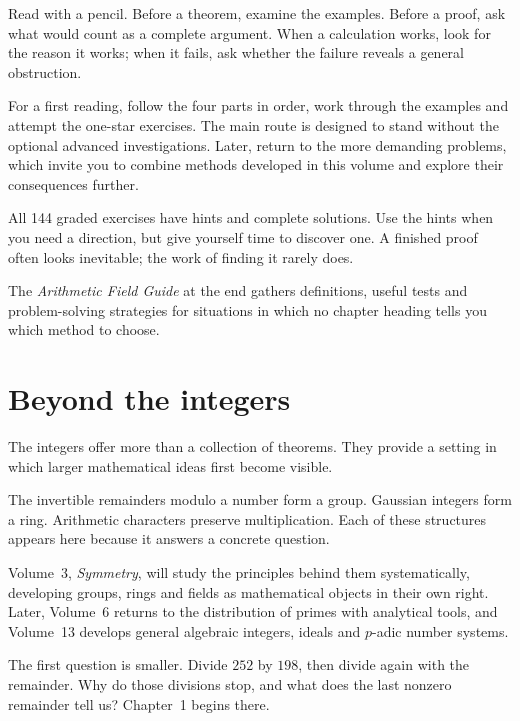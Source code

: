 Read with a pencil. Before a theorem, examine the examples. Before a proof, ask what would count as a complete argument. When a calculation works, look for the reason it works; when it fails, ask whether the failure reveals a general obstruction.

For a first reading, follow the four parts in order, work through the examples and attempt the one-star exercises. The main route is designed to stand without the optional advanced investigations. Later, return to the more demanding problems, which invite you to combine methods developed in this volume and explore their consequences further.

All 144 graded exercises have hints and complete solutions. Use the hints when you need a direction, but give yourself time to discover one. A finished proof often looks inevitable; the work of finding it rarely does.

The \emph{Arithmetic Field Guide} at the end gathers definitions, useful tests and problem-solving strategies for situations in which no chapter heading tells you which method to choose.

\section*{Beyond the integers}

The integers offer more than a collection of theorems. They provide a setting in which larger mathematical ideas first become visible.

The invertible remainders modulo a number form a group. Gaussian integers form a ring. Arithmetic characters preserve multiplication. Each of these structures appears here because it answers a concrete question.

Volume~3, \emph{Symmetry}, will study the principles behind them systematically, developing groups, rings and fields as mathematical objects in their own right. Later, Volume~6 returns to the distribution of primes with analytical tools, and Volume~13 develops general algebraic integers, ideals and $p$-adic number systems.

The first question is smaller. Divide $252$ by $198$, then divide again with the remainder. Why do those divisions stop, and what does the last nonzero remainder tell us? Chapter~1 begins there.
